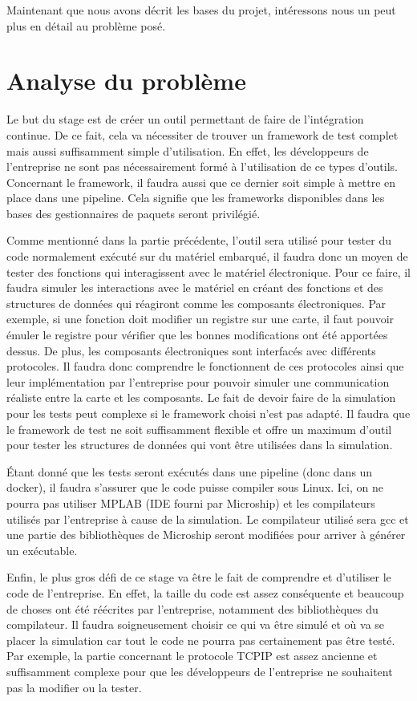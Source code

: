 \documentclass[a4paper]{article}
\begin{document}
Maintenant que nous avons décrit les bases du projet, intéressons nous un peut
plus en détail au problème posé.
\section{Analyse du problème}%

Le but du stage est de créer un outil permettant de faire de l'intégration
continue. De ce fait, cela va nécessiter de trouver un framework de test complet
mais aussi suffisamment simple d'utilisation. En effet, les développeurs de
l'entreprise ne sont pas nécessairement formé à l'utilisation de ce types
d'outils. Concernant le framework, il faudra aussi que ce dernier soit simple à
mettre en place dans une pipeline. Cela signifie que les frameworks disponibles
dans les bases des gestionnaires de paquets seront privilégié.

Comme mentionné dans la partie précédente, l'outil sera utilisé pour tester du
code normalement exécuté sur du matériel embarqué, il faudra donc un moyen de
tester des fonctions qui interagissent avec le matériel électronique. Pour ce
faire, il faudra simuler les interactions avec le matériel en créant des
fonctions et des structures de données qui réagiront comme les composants
électroniques. Par exemple, si une fonction doit modifier un registre sur une
carte, il faut pouvoir émuler le registre pour vérifier que les bonnes
modifications ont été apportées dessus. De plus, les composants électroniques
sont interfacés avec différents protocoles. Il faudra donc comprendre le
fonctionnent de ces protocoles ainsi que leur implémentation par l'entreprise
pour pouvoir simuler une communication réaliste entre la carte et les
composants. Le fait de devoir faire de la simulation pour les tests peut
complexe si le framework choisi n'est pas adapté. Il faudra que le framework de
test ne soit suffisamment flexible et offre un maximum d'outil pour tester les
structures de données qui vont être utilisées dans la simulation.

Étant donné que les tests seront exécutés dans une pipeline (donc dans un
docker), il faudra s'assurer que le code puisse compiler sous Linux. Ici, on ne
pourra pas utiliser MPLAB (IDE fourni par Microship) et les compilateurs
utilisés par l'entreprise à cause de la simulation. Le compilateur utilisé sera
gcc et une partie des bibliothèques de Microship seront modifiées pour arriver à
générer un exécutable.

Enfin, le plus gros défi de ce stage va être le fait de comprendre et d'utiliser
le code de l'entreprise. En effet, la taille du code est assez conséquente et
beaucoup de choses ont été réécrites par l'entreprise, notamment des
bibliothèques du compilateur. Il faudra soigneusement choisir ce qui va être
simulé et où va se placer la simulation car tout le code ne pourra pas
certainement pas être testé. Par exemple, la partie concernant le protocole
TCPIP est assez ancienne et suffisamment complexe pour que les développeurs de
l'entreprise ne souhaitent pas la modifier ou la tester.
\clearpage
\end{document}
